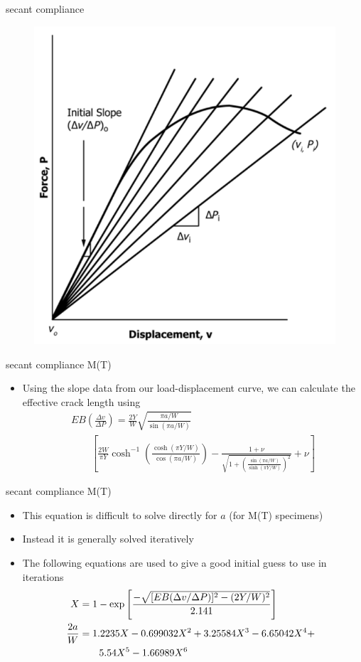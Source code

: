 \documentclass[10pt]{beamer}
\begin{document}
\begin{frame}{secant compliance}
	\begin{figure}
	\centering
	\includegraphics[width=0.7\linewidth]{secant}
	\label{fig:secant}
	\end{figure}
\end{frame}

\begin{frame}{secant compliance M(T)}
	\begin{itemize}[<+->]
		\item Using the slope data from our load-displacement curve, we can calculate the effective crack length using
		\begin{multline}
		EB\left(\frac{\Delta v}{\Delta P}\right) = \frac{2 Y}{W} \sqrt{\frac{\pi a / W}{\sin (\pi a / W)}} \\
		\qquad \left[\frac{2W}{\pi Y} \cosh^{-1} \left(\frac{\cosh(\pi Y/W)}{\cos (\pi a / W)}\right) - \frac{1+\nu}{\sqrt{1 + \left(\frac{\sin(\pi a/W)}{\sinh (\pi Y/W)}\right)^2}}+\nu\right]
		\end{multline}
	\end{itemize}
\end{frame}

\begin{frame}{secant compliance M(T)}
	\begin{itemize}[<+->]
		\item This equation is difficult to solve directly for $a$ (for M(T) specimens) 
		\item Instead it is generally solved iteratively
		\item The following equations are used to give a good initial guess to use in iterations
		\begin{align}
		X &= 1 - \exp \left[\frac{-\sqrt{[EB(\Delta v/ \Delta P)]^2 - (2Y/W)^2}}{2.141}\right]\\
		&\begin{aligned}
		\mathllap{\frac{2a}{W}} &= 1.2235X - 0.699032X^2 + 3.25584X^3 - 6.65042X^4 + \\
		&\qquad5.54X^5 - 1.66989X^6
		\end{aligned}
		\end{align}
	\end{itemize}
\end{frame}
\end{document}
